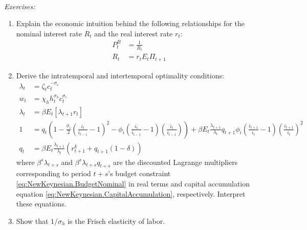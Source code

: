 ~\\\noindent\emph{Exercises:}
\begin{enumerate}[resume]

\item Explain the economic intuition behind the following relationships for the nominal interest rate $R_t$ and the real interest rate $r_t$:
\begin{align}
P^B_t &= \frac{1}{R_t} \label{eq:NewKeynesian.NominalInterestRate}
\\
R_t &= r_t E_t \Pi_{t+1} \label{eq:NewKeynesian.RealInterestRate}
\end{align}

\item Derive the intratemporal and intertemporal optimality conditions:
\begin{align}
\lambda_t &= \zeta_t c_t^{-\sigma_c} \label{eq:NewKeynesian.MarginalUtility}
\\
w_t &= \chi_h h_t^{\sigma_h} c_t^{\sigma_c}
\label{eq:NewKeynesian.LaborSupply}
\\
\lambda_t &= \beta E_t \left[\lambda_{t+1} r_t\right]
\label{eq:NewKeynesian.EulerBond}
\\
1 &= q_t \left( 1 - \frac{\phi_i}{2} \left(\frac{i_t}{i_{t-1}}-1\right)^2 - \phi_i \left(\frac{i_t}{i_{t-1}}-1\right)\left(\frac{i_t}{i_{t-1}}\right) \right)
  + \beta E_t \frac{\lambda_{t+1}}{\lambda_t} q_{t+1} \phi_i \left(\frac{i_{t+1}}{i_{t}}-1\right)\left(\frac{i_{t+1}}{i_{t}}\right)^2
\label{eq:NewKeynesian.EulerInvestment}
\\
q_t &= \beta E_t \frac{\lambda_{t+1}}{\lambda_t} \left( r^k_{t+1} + q_{t+1}(1-\delta) \right)
\label{eq:NewKeynesian.EulerCapital}
\end{align}
where $\beta^s\lambda_{t+s}$ and $\beta^s \lambda_{t+s} q_{t+s}$ are the discounted Lagrange multipliers
  corresponding to period $t+s$'s budget constraint \eqref{eq:NewKeynesian.BudgetNominal} in real terms
   and capital accumulation equation \eqref{eq:NewKeynesian.CapitalAccumulation}, respectively.
Interpret these equations.

\item Show that $1/\sigma_h$ is the Frisch elasticity of labor.

\end{enumerate}


